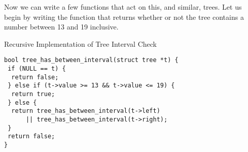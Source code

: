 







Now we can write a few functions that act on this, and similar, trees. Let us begin by writing the function that returns whether or not the tree contains a number between 13 and 19 inclusive. 

\begin{cl}[main.c]{Recursive Implementation of Tree Interval Check}\begin{lstlisting}[language=MyC]
bool tree_has_between_interval(struct tree *t) {
 if (NULL == t) {
  return false;
 } else if (t->value >= 13 && t->value <= 19) {
  return true;
 } else {
  return tree_has_between_interval(t->left)
      || tree_has_between_interval(t->right);
 }
 return false;
}
\end{lstlisting}\end{cl}

